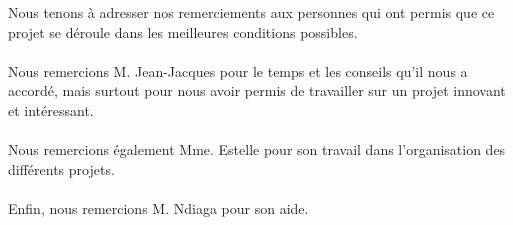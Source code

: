Nous tenons à adresser nos remerciements aux personnes qui ont permis que ce projet se déroule dans les meilleures conditions possibles.\\
\\
Nous remercions M. Jean-Jacques  pour le temps et les conseils qu'il nous a accordé, mais surtout pour nous avoir permis de travailler sur un projet innovant et intéressant.\\
\\
Nous remercions également Mme. Estelle  pour son travail dans l'organisation des différents projets. \\
\\
Enfin, nous remercions M. Ndiaga  pour son aide. 
